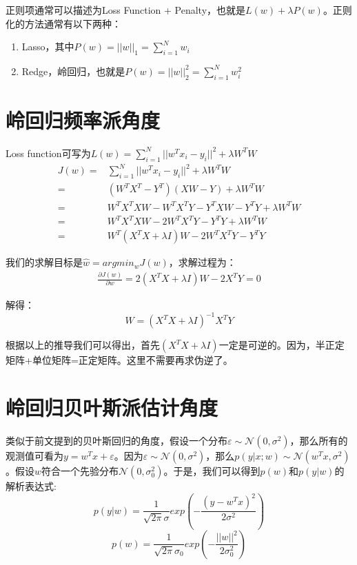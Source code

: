 \documentclass[a4paper]{article}
\begin{document}
正则项通常可以描述为Loss Function + Penalty，也就是$L(w)+\lambda P(w)$。正则化的方法通常有以下两种：
\begin{enumerate}[itemindent = 1em, itemsep = 0.4pt, parsep=0.5pt, topsep = 0.5pt]
\item Lasso，其中$P(w) = ||w||_1 = \sum_{i=1}^Nw_i$
\item Redge，岭回归，也就是$P(w)=||w||_2^2=\sum_{i=1}^Nw_i^2$
\end{enumerate}

\section{岭回归频率派角度}
Loss function可写为$ L(w)=\sum_{i=1}^N||w^Tx_i-y_i||^2 + \lambda W^TW$
\begin{align}
    J(w) = & \sum_{i=1}^N||w^Tx_i-y_i||^2 + \lambda W^TW \\
    \nonumber = & (W^TX^T - Y^T)(XW-Y)+\lambda W^TW \\
    \nonumber = & W^TX^TXW - W^TX^TY - Y^TXW - Y^TY + \lambda W^TW \\ 
    \nonumber = & W^TX^TXW - 2W^TX^TY - Y^TY + \lambda W^TW \\
    \nonumber = & W^T(X^TX + \lambda I)W - 2W^TX^TY - Y^TY 
\end{align}

我们的求解目标是$\hat{w} = argmin_w J(w)$，求解过程为：
\begin{align}
    \frac{\partial J(w)}{\partial w} = 2(X^TX + \lambda I)W - 2X^TY = 0
\end{align}

解得：
\begin{equation}
    W = (X^TX + \lambda I)^{-1}X^TY 
\end{equation}

根据以上的推导我们可以得出，首先$(X^TX + \lambda I)$一定是可逆的。因为，半正定矩阵+单位矩阵=正定矩阵。这里不需要再求伪逆了。

\section{岭回归贝叶斯派估计角度}
类似于前文提到的贝叶斯回归的角度，假设一个分布$\varepsilon \sim \mathcal{N}(0,\sigma^2)$，那么所有的观测值可看为$y = w^Tx + \varepsilon$。因为$\varepsilon \sim \mathcal{N}(0,\sigma^2)$，那么$p(y|x;w) \sim \mathcal{N}(w^Tx, \sigma^2)$。假设$w$符合一个先验分布$\mathcal{N}(0, \sigma_{0}^{2})$。于是，我们可以得到$p(w)$和$p(y|w)$的解析表达式:
\begin{equation}
    p(y|w) = \frac{1}{\sqrt{2\pi}\sigma}exp\left( -\frac{(y - w^Tx)^2}{2\sigma^2} \right)
\end{equation}
\begin{equation}
    p(w) = \frac{1}{\sqrt{2\pi}\sigma_0}exp\left( -\frac{||w||^2}{2\sigma_0^2} \right)
\end{equation}
\end{document}

